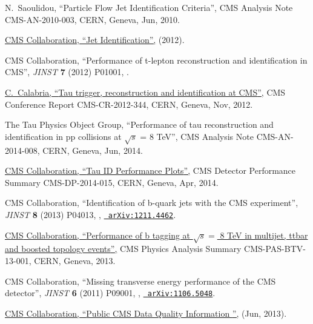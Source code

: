 \documentclass[12pt]{thesis}  %
\begin{document}
\begin{thebibliography}{100}
\hrefCMSnoop {} {N.~Saoulidou, ``Particle Flow Jet Identification Criteria'',}
  CMS Analysis Note CMS-AN-2010-003, CERN, Geneva, Jun, 2010.

\href {https://twiki.cern.ch/twiki/bin/viewauth/CMS/JetID} {{ CMS}
  Collaboration, ``Jet Identification'',} (2012).

\hrefCMSnoop {} {{ CMS} Collaboration, ``Performance of t-lepton reconstruction
  and identification in CMS'',} \textit{ JINST} \textbf{ 7} (2012) P01001,
  \href{http://dx.doi.org/10.1088/1748-0221/7/01/P01001}{}.

\href {https://cds.cern.ch/record/1516071} {C.~Calabria, ``{Tau trigger,
  reconstruction and identification at CMS}'',} CMS Conference Report
  CMS-CR-2012-344, CERN, Geneva, Nov, 2012.

\hrefCMSnoop {} {{The Tau Physics Object Group}, ``Performance of tau
  reconstruction and identification in pp collisions at $\sqrt{s}$ = 8 TeV'',}
  CMS Analysis Note CMS-AN-2014-008, CERN, Geneva, Jun, 2014.

\href {https://cds.cern.ch/record/1704439} {{ CMS} Collaboration, ``{Tau ID
  Performance Plots}'',} CMS Detector Performance Summary CMS-DP-2014-015,
  CERN, Geneva, Apr, 2014.

\hrefCMSnoop {} {{ CMS} Collaboration, ``{Identification of b-quark jets with
  the CMS experiment}'',} \textit{ JINST} \textbf{ 8} (2013) P04013,
  \href{http://dx.doi.org/10.1088/1748-0221/8/04/P04013}{},
\href{http://www.arXiv.org/abs/1211.4462}{\texttt{ arXiv:1211.4462}}.

\href {http://cds.cern.ch/record/1581306/} {{ CMS} Collaboration,
  ``{Performance of b tagging at $\sqrt{s} =$ 8 TeV in multijet, ttbar and
  boosted topology events}'',} CMS Physics Analysis Summary CMS-PAS-BTV-13-001,
  CERN, Geneva, 2013.

\hrefCMSnoop {} {{ CMS} Collaboration, ``Missing transverse energy performance
  of the CMS detector'',} \textit{ JINST} \textbf{ 6} (2011) P09001,
  \href{http://dx.doi.org/doi:10.1088/1748-0221/6/09/P09001}{},
  \href{http://www.arXiv.org/abs/1106.5048}{\texttt{ arXiv:1106.5048}}.

\href {https://twiki.cern.ch/twiki/bin/view/CMSPublic/DataQuality} {{ CMS}
  Collaboration, ``{Public CMS Data Quality Information }'',} (Jun, 2013).


\end{thebibliography}
\end{document}

